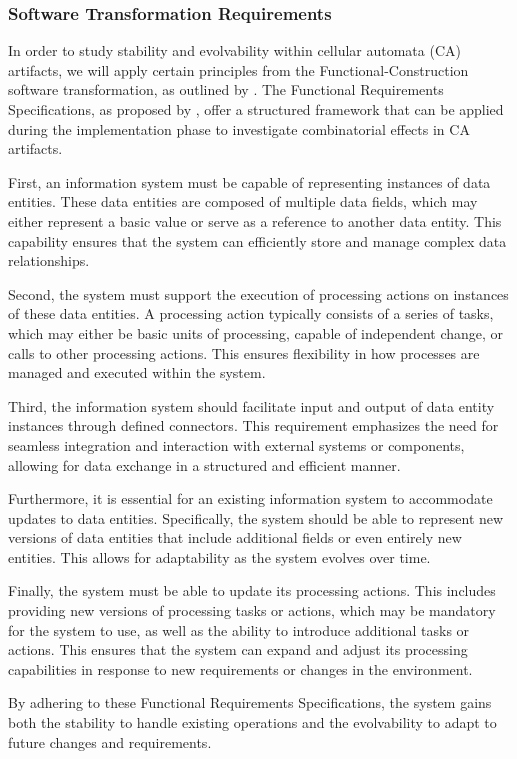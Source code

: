 \subsubsection{Software Transformation Requirements} \label{sec_requirements_transformation}

In order to study stability and evolvability within cellular automata (CA) artifacts, we
will apply certain principles from the Functional-Construction software transformation, as
outlined by \textcite[251]{mannaert_normalized_2016}. The Functional Requirements
Specifications, as proposed by \textcite[254-261]{mannaert_normalized_2016}, offer a
structured framework that can be applied during the implementation phase to investigate
combinatorial effects in CA artifacts.

First, an information system must be capable of representing instances of data entities.
These data entities are composed of multiple data fields, which may either represent a
basic value or serve as a reference to another data entity. This capability ensures that
the system can efficiently store and manage complex data relationships.

Second, the system must support the execution of processing actions on instances of these
data entities. A processing action typically consists of a series of tasks, which may
either be basic units of processing, capable of independent change, or calls to other
processing actions. This ensures flexibility in how processes are managed and executed
within the system.

Third, the information system should facilitate input and output of data entity instances
through defined connectors. This requirement emphasizes the need for seamless integration
and interaction with external systems or components, allowing for data exchange in a
structured and efficient manner.

Furthermore, it is essential for an existing information system to accommodate updates to
data entities. Specifically, the system should be able to represent new versions of data
entities that include additional fields or even entirely new entities. This allows for
adaptability as the system evolves over time.

Finally, the system must be able to update its processing actions. This includes providing
new versions of processing tasks or actions, which may be mandatory for the system to use,
as well as the ability to introduce additional tasks or actions. This ensures that the
system can expand and adjust its processing capabilities in response to new requirements
or changes in the environment.

By adhering to these Functional Requirements Specifications, the system gains both the
stability to handle existing operations and the evolvability to adapt to future changes
and requirements.
